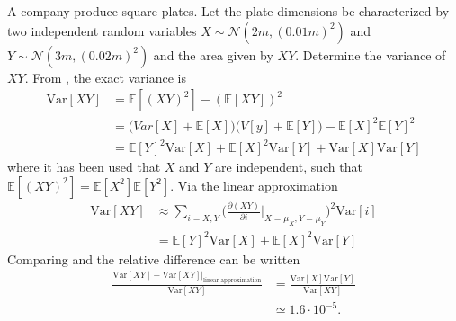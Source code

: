 \begin{example}
	A company produce square plates. Let the plate dimensions be characterized by two independent random variables $X\sim \mathcal{N}(2m,(0.01m)^2)$ and $Y\sim \mathcal{N}(3m,(0.02m)^2)$ and the area given by $XY$. Determine the variance of $XY$. From , the exact variance is
	\begin{equation}
		\label{eq:var1}
		\begin{split}
			\text{Var}[XY]&=\mathbb{E}[(XY)^2]-(\mathbb{E}[XY])^2\\
			&=\bigg(Var[X]+\mathbb{E}[X]\bigg)\bigg(V[y]+\mathbb{E}[Y]\bigg)-\mathbb{E}[X]^2\mathbb{E}[Y]^2\\
			&=\mathbb{E}[Y]^2\text{Var}[X]+\mathbb{E}[X]^2\text{Var}[Y]+\text{Var}[X]\text{Var}[Y]
		\end{split}
	\end{equation}
	where it has been used that $X$ and $Y$ are independent, such that $\mathbb{E}[(XY)^2]=\mathbb{E}[X^2]\mathbb{E}[Y^2]$.	Via the linear approximation
	\begin{equation}
		\label{eq:var2}
		\begin{split}
			\text{Var}[XY]&\approx\sum_{i = X,Y} \bigg( \frac{\partial (XY)}{\partial i}\bigg|_{X = \mu_X,Y = \mu_Y}  \bigg)^2\text{Var}[i]\\
			&=\mathbb{E}[Y]^2\text{Var}[X]+\mathbb{E}[X]^2\text{Var}[Y]
		\end{split}
	\end{equation}
	Comparing  and  the relative difference can be written
	\begin{equation}
		\begin{split}
			\frac{\text{Var}[XY]-\text{Var}[XY]|_{\text{linear approximation}}}{\text{Var}[XY]} &= \frac{\text{Var}[X]\text{Var}[Y]}{\text{Var}[XY]}\\
			& \simeq 1.6\cdot 10^{-5}.
		\end{split}
	\end{equation}
	
\end{example}

